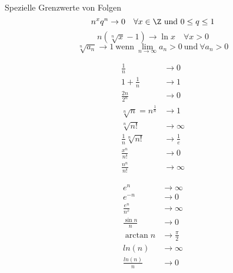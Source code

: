 \graphicspath{}
\begin{highlight}{Spezielle Grenzwerte von Folgen}
    \begin{equation*}
        n^x q^n \to 0 \quad \forall x \in \Z~\text{und}~0 \leq q \leq 1
    \end{equation*}
    \begin{equation*}
         n(\sqrt[n]{x} - 1) \to \ln x \quad \forall x>0
    \end{equation*}
    \begin{equation*}
        \sqrt[n]{a_n} \to 1 ~\text{wenn}~ \lim_{n \to \infty} a_n > 0 ~\text{und}~ \forall a_n > 0 
    \end{equation*}
    \begin{center}
        \begin{minipage}{0.3\linewidth}
            \begin{align*}
                \frac{1}{n} &\to 0\\
                1 + \frac{1}{n} &\to 1\\
                \frac{2n}{2^n} &\to 0\\
                \sqrt[n]{n} = n^{\frac{1}{n}} &\to 1\\
                \sqrt[n]{n!} &\to \infty\\
                \frac{1}{n}\sqrt[n]{n!} &\to \frac{1}{e}\\
                \frac{x^n}{n!} &\to 0\\
                \frac{n^n}{n!} &\to \infty
            \end{align*}
        \end{minipage}
        \hfill\vline\hfill
        \begin{minipage}{0.3\linewidth}
            \begin{align*}
                e^n &\to \infty\\
                e^{-n} &\to 0\\
                \frac{e^n}{n^x} &\to \infty\\
                \frac{\sin n}{n} &\to 0\\
                \arctan n &\to \frac{\pi}{2}\\
                ln(n) &\to \infty\\
                \frac{ln(n)}{n} &\to 0\\

\end{align*}
\end{minipage}
\end{center}
\end{highlight}
